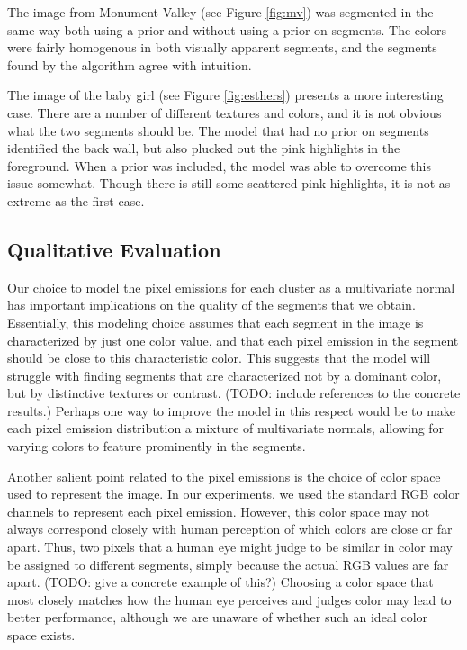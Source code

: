 \documentclass[12pt]{article}
\begin{document}
The image from Monument Valley (see Figure \ref{fig:mv}) was segmented in the
same way both using a prior and without using a prior on segments. The colors
were fairly homogenous in both visually apparent segments, and the segments
found by the algorithm agree with intuition.

The image of the baby girl (see Figure \ref{fig:esthers}) presents a more
interesting case. There are a number of different textures and colors, and it
is not obvious what the two segments should be. The model that had no prior on
segments identified the back wall, but also plucked out the pink highlights in
the foreground. When a prior was included, the model was able to overcome this
issue somewhat. Though there is still some scattered pink highlights, it is not
as extreme as the first case.


\subsection*{Qualitative Evaluation}
Our choice to model the pixel emissions for each cluster as a multivariate normal has important
implications on the quality of the segments that we obtain.
Essentially, this modeling choice assumes that each segment in the image is characterized by just one
color value, and that each pixel emission in the segment should be close to this characteristic
color. This suggests that the model will struggle with finding segments that are characterized
not by a dominant color, but by distinctive textures or contrast. (TODO: include references to
the concrete results.) Perhaps one way to improve the model in this respect would be to make each
pixel emission distribution a mixture of multivariate normals, allowing for varying colors to feature
prominently in the segments.

Another salient point related to the pixel emissions is the choice of color space used to represent
the image.
In our experiments, we used the standard RGB color channels to represent each pixel emission.
However, this color space may not always correspond closely with human perception of which colors are
close or far apart.
Thus, two pixels that a human eye might judge to be similar in color may be assigned to different
segments, simply because the actual RGB values are far apart. (TODO: give a concrete example of this?)
Choosing a color space that most closely matches how the human eye perceives and judges color may
lead to better performance, although we are unaware of whether such an ideal color space exists.
\end{document}

